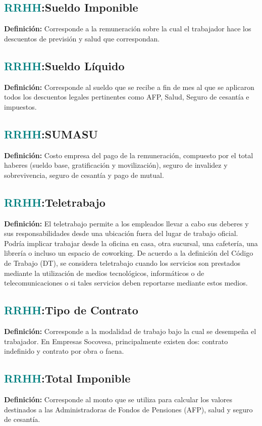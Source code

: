 \documentclass[12pt]{article}
\begin{document}
\subsection{\textcolor{teal}{RRHH}:{Sueldo Imponible}}
\textbf{Definición:} Corresponde a la remuneración sobre la cual el trabajador hace los descuentos de previsión y salud que correspondan.
\subsection{\textcolor{teal}{RRHH}:{Sueldo Líquido}}
\textbf{Definición:} Corresponde al sueldo que se recibe a fin de mes al que se aplicaron todos los descuentos legales pertinentes como AFP, Salud, Seguro de cesantía e impuestos.
\subsection{\textcolor{teal}{RRHH}:{SUMASU}}
\textbf{Definición:} Costo empresa del pago de la remuneración, compuesto por el total haberes (sueldo base, gratificación y movilización), seguro de invalidez y sobrevivencia, seguro de cesantía y pago de mutual.
\subsection{\textcolor{teal}{RRHH}:{Teletrabajo}}
\textbf{Definición:} El teletrabajo permite a los empleados llevar a cabo sus deberes y sus responsabilidades desde una ubicación fuera del lugar de trabajo oficial. Podría implicar trabajar desde la oficina en casa, otra sucursal, una cafetería, una librería o incluso un espacio de coworking.
De acuerdo a la definición del Código de Trabajo (DT), se considera teletrabajo cuando los servicios son prestados mediante la utilización de medios tecnológicos, informáticos o de telecomunicaciones o si tales servicios deben reportarse mediante estos medios.

\subsection{\textcolor{teal}{RRHH}:{Tipo de Contrato}}
\textbf{Definición:} Corresponde a la modalidad de trabajo bajo la cual se desempeña el trabajador. En Empresas Socovesa, principalmente existen dos: contrato indefinido y contrato por obra o faena.
\subsection{\textcolor{teal}{RRHH}:{Total Imponible}}
\textbf{Definición:} Corresponde al monto que se utiliza para calcular los valores destinados a las Administradoras de Fondos de Pensiones (AFP), salud y seguro de cesantía.
\end{document}
